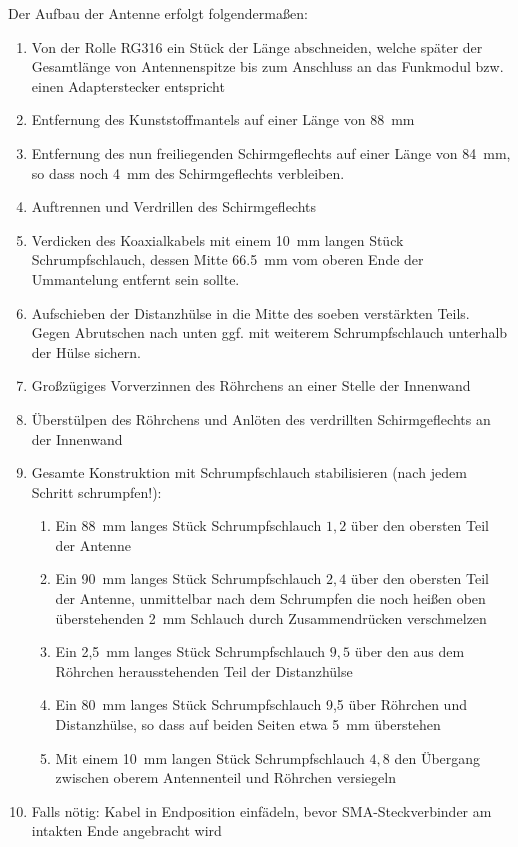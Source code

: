 \documentclass[paper=a4, parskip, numbers=noenddot, toc=listof, headsepline]{scrbook}
\begin{document}
			Der Aufbau der Antenne erfolgt folgendermaßen:
			\begin{enumerate}
				\item
				      Von der Rolle RG316 ein Stück der Länge abschneiden, welche später der Gesamtlänge von Antennenspitze bis zum Anschluss an das Funkmodul bzw. einen Adapterstecker entspricht			 
				\item
				      Entfernung des Kunststoffmantels auf einer Länge von \SI{88}{\milli\metre}
				\item
				      Entfernung des nun freiliegenden Schirmgeflechts auf einer Länge von \SI{84}{\milli\metre}, so dass noch \SI{4}{\milli\metre} des Schirmgeflechts verbleiben.
				\item
				      Auftrennen und Verdrillen des Schirmgeflechts
				\item
				      Verdicken des Koaxialkabels mit einem \SI{10}{\milli\metre} langen Stück Schrumpfschlauch, dessen Mitte \SI{66,5}{\milli\metre} vom oberen Ende der Ummantelung entfernt sein sollte.
				\item
				      Aufschieben der Distanzhülse in die Mitte des soeben verstärkten Teils. Gegen Abrutschen nach unten ggf. mit weiterem Schrumpfschlauch unterhalb der Hülse sichern.
				\item
				      Großzügiges Vorverzinnen des Röhrchens an einer Stelle der Innenwand
				\item
				      Überstülpen des Röhrchens und Anlöten des verdrillten Schirmgeflechts an der Innenwand
				\item
				      Gesamte Konstruktion mit Schrumpfschlauch stabilisieren (nach jedem Schritt schrumpfen!):
				      \begin{enumerate}
					      \item
					            Ein \SI{88}{\milli\metre} langes Stück Schrumpfschlauch $1,2$ über den obersten Teil der Antenne
					      \item
					            Ein \SI{90}{\milli\metre} langes Stück Schrumpfschlauch $2,4$ über den obersten Teil der Antenne, unmittelbar nach dem Schrumpfen die noch heißen oben überstehenden \SI{2}{\milli\metre} Schlauch durch Zusammendrücken verschmelzen
					      \item
					            Ein 2,\SI{5}{\milli\metre} langes Stück Schrumpfschlauch $9,5$ über den aus dem Röhrchen herausstehenden Teil der Distanzhülse
					      \item
					            Ein \SI{80}{\milli\metre} langes Stück Schrumpfschlauch 9,5 über Röhrchen und Distanzhülse, so dass auf beiden Seiten etwa \SI{5}{\milli\metre} überstehen
					      \item
					            Mit einem \SI{10}{\milli\metre} langen Stück Schrumpfschlauch $4,8$ den Übergang zwischen oberem Antennenteil und Röhrchen versiegeln
				      \end{enumerate}
				\item
				      Falls nötig: Kabel in Endposition einfädeln, bevor SMA-Steckverbinder am intakten Ende angebracht wird
			\end{enumerate}
\end{document}
